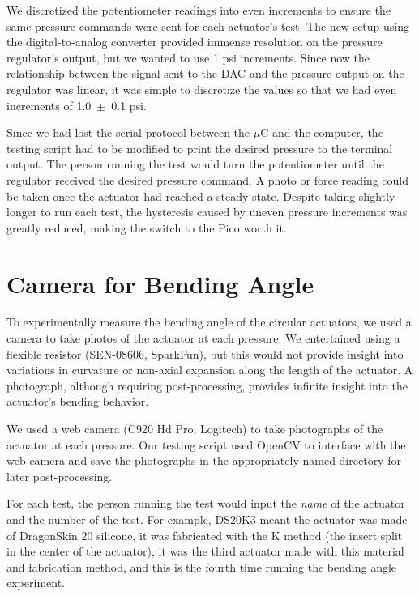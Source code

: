 We discretized the potentiometer readings into even increments to ensure the same pressure commands were sent for each actuator's test. The new setup using the digital-to-analog converter provided immense resolution on the pressure regulator's output, but we wanted to use 1 psi increments. Since now the relationship between the signal sent to the DAC and the pressure output on the regulator was linear, it was simple to discretize the values so that we had even increments of 1.0~$\pm$~0.1 psi. 

Since we had lost the serial protocol between the $\mu$C and the computer, the testing script had to be modified to print the desired pressure to the terminal output. The person running the test would turn the potentiometer until the regulator received the desired pressure command. A photo or force reading could be taken once the actuator had reached a steady state. Despite taking slightly longer to run each test, the hysteresis caused by uneven pressure increments was greatly reduced, making the switch to the Pico worth it. 

\clearpage
\section{Camera for Bending Angle}

To experimentally measure the bending angle of the circular actuators, we used a camera to take photos of the actuator at each pressure. We entertained using a flexible resistor (SEN-08606, SparkFun), but this would not provide insight into variations in curvature or non-axial expansion along the length of the actuator. A photograph, although requiring post-processing, provides infinite insight into the actuator's bending behavior. 

We used a web camera (C920 Hd Pro, Logitech) to take photographs of the actuator at each pressure. Our testing script used OpenCV \cite{opencv_library} to interface with the web camera and save the photographs in the appropriately named directory for later post-processing. 

For each test, the person running the test would input the \emph{name} of the actuator and the number of the test. For example, DS20K3 meant the actuator was made of DragonSkin 20 silicone, it was fabricated with the K method (the insert split in the center of the actuator), it was the third actuator made with this material and fabrication method, and this is the fourth time running the bending angle experiment. 

